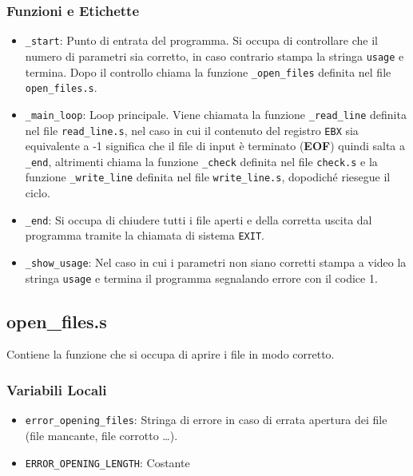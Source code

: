\documentclass[a4paper,11pt]{article}
\begin{document}
		\subsubsection{Funzioni e Etichette}
	\begin{itemize}
		\item \texttt{\_start}: Punto di entrata del programma. Si occupa di controllare che il numero di parametri sia corretto, in caso contrario stampa la stringa \texttt{usage} e termina. Dopo il controllo chiama la funzione \texttt{\_open\_files} definita nel file \texttt{open\_files.s}. 
		\item \texttt{\_main\_loop}: Loop principale. Viene chiamata la funzione \texttt{\_read\_line} definita nel file \texttt{read\_line.s}, nel caso in cui il contenuto del registro \texttt{EBX} sia equivalente a -1 significa che il file di input è terminato (\textbf{EOF}) quindi salta a \texttt{\_end}, altrimenti chiama la funzione \texttt{\_check} definita nel file \texttt{check.s} e la funzione \texttt{\_write\_line} definita nel file \texttt{write\_line.s}, dopodiché riesegue il ciclo.
		\item \texttt{\_end}: Si occupa di chiudere tutti i file aperti e della corretta uscita dal programma tramite la chiamata di sistema \texttt{EXIT}.
		\item \texttt{\_show\_usage}: Nel caso in cui i parametri non siano corretti stampa a video la stringa \texttt{usage} e termina il programma segnalando errore con il codice 1.
	\end{itemize}  
	
	\subsection{open\_files.s}
	Contiene la funzione che si occupa di aprire i file in modo corretto.
	\subsubsection{Variabili Locali} 
	\begin{itemize}
		\item \texttt{error\_opening\_files}: Stringa di errore in caso di errata apertura dei file (file mancante, file corrotto \ldots).
		\item \texttt{ERROR\_OPENING\_LENGTH}: Costante 
	\end{itemize}
\end{document}
